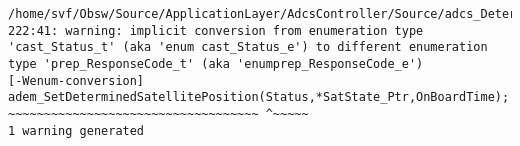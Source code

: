 
\noindent\begin{minipage}{\textwidth}
\begin{lstlisting}[language={}, caption=3rd warning example., label=srciror_3]
/home/svf/Obsw/Source/ApplicationLayer/AdcsController/Source/adcs_DetermineSatellitePosition.c: 222:41: warning: implicit conversion from enumeration type 'cast_Status_t' (aka 'enum cast_Status_e') to different enumeration type 'prep_ResponseCode_t' (aka 'enumprep_ResponseCode_e') 
[-Wenum-conversion]
adem_SetDeterminedSatellitePosition(Status,*SatState_Ptr,OnBoardTime);
~~~~~~~~~~~~~~~~~~~~~~~~~~~~~~~~~~~ ^~~~~~ 
1 warning generated
\end{lstlisting}
\end{minipage}
